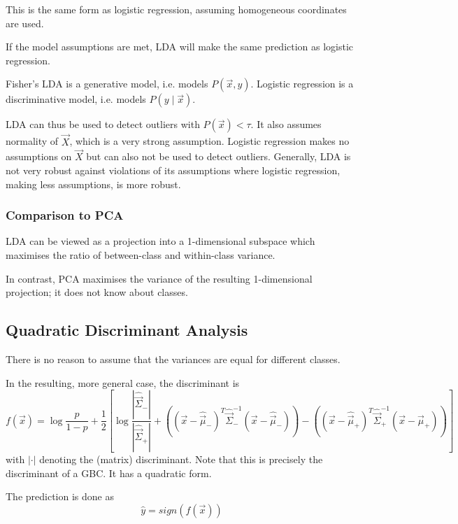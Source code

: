 This is the same form
as logistic regression,
assuming homogeneous coordinates
are used.

If the model assumptions are met,
LDA will make the same prediction
as logistic regression.

Fisher's LDA is a generative model,
i.e. models $P(\vec{x}, y)$.
Logistic regression is a discriminative
model, i.e. models $P(y \mid \vec{x})$.

LDA can thus be used to detect
outliers with $P(\vec{x}) < \tau$.
It also assumes normality of $\vec{X}$,
which is a very strong assumption.
Logistic regression makes no assumptions
on $\vec{X}$ but can also not be
used to detect outliers.
Generally, LDA is not very robust
against violations of its assumptions
where logistic regression,
making less assumptions, is more robust.


\subsubsection{Comparison to PCA}
LDA can be viewed as a projection into
a 1-dimensional subspace
which maximises the ratio of
between-class and within-class variance.

In contrast, PCA maximises the
variance of the resulting
1-dimensional projection;
it does not know about classes.


\subsection{Quadratic Discriminant Analysis}
There is no reason to assume that the
variances are equal for different classes.

In the resulting, more general case,
the discriminant is
\begin{equation*}
    f(\vec{x}) =
    \log{\frac{p}{1-p}} +
    \frac{1}{2} \left[
        \log{\frac{|\hat{\vec{\Sigma}}_-|}{|\hat{\vec{\Sigma}}_+|}}
        +
        \left(
        (\vec{x}-\hat{\vec{\mu}}_-)^T
        \hat{\vec{\Sigma}}_-^{-1}
        (\vec{x}-\hat{\vec{\mu}}_-)
        \right)
        -
        \left(
        (\vec{x}-\hat{\vec{\mu}}_+)^T
        \hat{\vec{\Sigma}}_+^{-1}
        (\vec{x}-\hat{\vec{\mu}}_+)
        \right)
    \right]
\end{equation*}
with $|\cdot|$ denoting the (matrix)
discriminant.
Note that this is precisely the discriminant
of a GBC.
It has a quadratic form.

The prediction is done as
\begin{equation*}
    \hat{y} = sign(f(\vec{x}))
\end{equation*}

